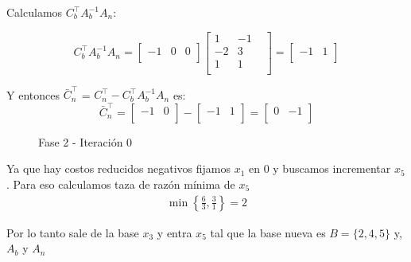\documentclass{article}
\begin{document}
\begin{flushleft}
		Calculamos $C_b^\intercal$$A_b^{-1}$$A_n$:
		
		\begin{equation*}
			C_b^\intercal A_b^{-1}A_n = \begin{bmatrix}
				-1 & 0 & 0 \\
			\end{bmatrix}
			\begin{bmatrix}
				1 & -1 &\\
				-2 & 3 & \\
				1 & 1 & \\
			\end{bmatrix} = \begin{bmatrix}
				-1 & 1\\
			\end{bmatrix}
		\end{equation*}

		Y entonces \(\bar{C}_n^\intercal\) = \(C_n^\intercal - C_b^\intercal A_b^{-1} A_n\) es:
		\begin{equation*}
			\bar{C}_n^\intercal = \begin{bmatrix}
				-1 & 0 \\
			\end{bmatrix} - \begin{bmatrix}
				-1 & 1\\
			\end{bmatrix} = \begin{bmatrix}
				0 & -1\\
			\end{bmatrix}
		\end{equation*}

		\begin{figure}[ht]
			\centering
			\caption{Fase 2 - Iteración 0}
			\label{fig:grafico}
		\end{figure}

		Ya que hay costos reducidos negativos fijamos $x_1$ en 0 y buscamos incrementar $x_5$. Para eso calculamos taza de razón mínima de $x_5$\\

		\begin{equation*}
			\begin{array}{cc}
				\min \left\{ \frac{6}{3}, \frac{3}{1} \right\} = 2 
			\end{array}
		\end{equation*}

		Por lo tanto sale de la base $x_3$ y entra $x_5$ tal que la base nueva es $B = \{2,4,5\}$ y, $A_b$ y $A_n$\\


\end{flushleft}
\end{document}
